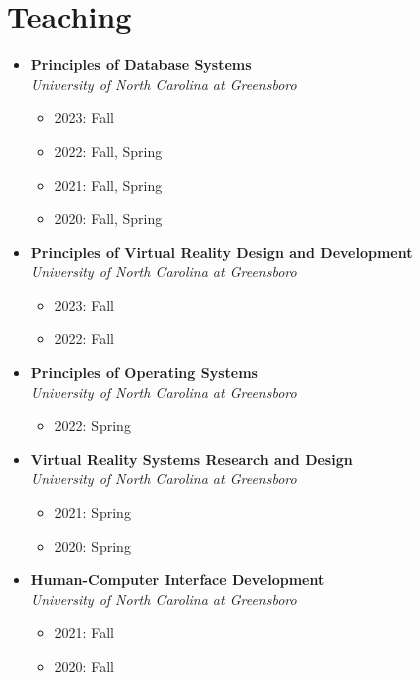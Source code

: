 \documentclass[wideaddress]{vitae}
\let\olditem\item
\def\item{\nopagebreak[4]\olditem}%
\begin{document}
\section{Teaching}
\begin{itemize}
        \item \textbf{Principles of Database Systems}              						\\\textit{University of North Carolina at Greensboro}
        \begin{itemize}
            \item 2023: Fall
            \item 2022: Fall, Spring
            \item 2021: Fall, Spring
            \item 2020: Fall, Spring
        \end{itemize}
        \item \textbf{Principles of Virtual Reality Design and Development}        		\\\textit{University of North Carolina at Greensboro}
        \begin{itemize}
            \item 2023: Fall
            \item 2022: Fall
        \end{itemize}
        \item \textbf{Principles of Operating Systems}              					\\\textit{University of North Carolina at Greensboro}
        \begin{itemize}
            \item 2022: Spring
        \end{itemize}
        \item \textbf{Virtual Reality Systems Research and Design}              		\\\textit{University of North Carolina at Greensboro}
        \begin{itemize}
            \item 2021: Spring
            \item 2020: Spring
        \end{itemize}
        \item \textbf{Human-Computer Interface Development}		    					\\\textit{University of North Carolina at Greensboro}
        \begin{itemize}
            \item 2021: Fall
            \item 2020: Fall

\end{itemize}
\end{itemize}
\end{document}
